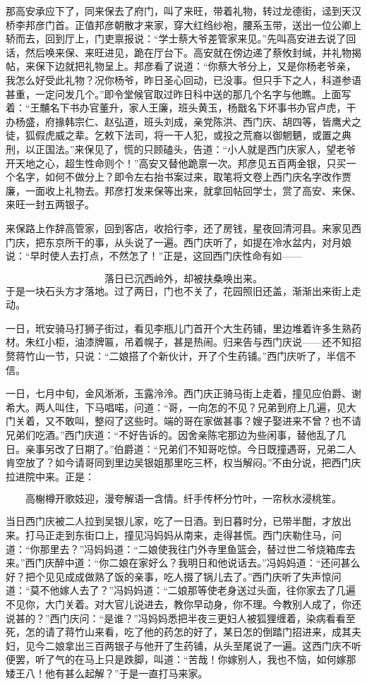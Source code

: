 那高安承应下了，同来保去了府门，叫了来旺，带着礼物，转过龙德街，迳到天汉桥李邦彦门首。正值邦彦朝散才来家，穿大红绉纱袍，腰系玉带，送出一位公卿上轿而去，回到厅上，门吏禀报说：“学士蔡大爷差管家来见。”先叫高安进去说了回话，然后唤来保、来旺进见，跪在厅台下。高安就在傍边递了蔡攸封缄，并礼物揭帖，来保下边就把礼物呈上。邦彦看了说道：“你蔡大爷分上，又是你杨老爷亲，我怎么好受此礼物？况你杨爷，昨日圣心回动，已没事。但只手下之人，科道参语甚重，一定问发几个。”即令堂候官取过昨日科中送的那几个名字与他瞧。上面写着：“王黼名下书办官董升，家人王廉，班头黄玉，杨戬名下坏事书办官卢虎，干办杨盛，府掾韩宗仁、赵弘道，班头刘成，亲党陈洪、西门庆、胡四等，皆鹰犬之徒，狐假虎威之辈。乞敕下法司，将一干人犯，或投之荒裔以御魍魉，或置之典刑，以正国法。”来保见了，慌的只顾磕头，告道：“小人就是西门庆家人，望老爷开天地之心，超生性命则个！”高安又替他跪禀一次。邦彦见五百两金银，只买一个名字，如何不做分上？即令左右抬书案过来，取笔将文卷上西门庆名字改作贾廉，一面收上礼物去。邦彦打发来保等出来，就拿回帖回学士，赏了高安、来保、来旺一封五两银子。

来保路上作辞高管家，回到客店，收拾行李，还了房钱，星夜回清河县。来家见西门庆，把东京所干的事，从头说了一遍。西门庆听了，如提在冷水盆内，对月娘说：“早时使人去打点，不然怎了！”正是，这回西门庆性命有如——

\[
落日已沉西岭外，却被扶桑唤出来。
\]
于是一块石头方才落地。过了两日，门也不关了，花园照旧还盖，渐渐出来街上走动。

一日，玳安骑马打狮子街过，看见李瓶儿门首开个大生药铺，里边堆着许多生熟药材。朱红小柜，油漆牌匾，吊着幌子，甚是热闹。归来告与西门庆说——还不知招赘蒋竹山一节，只说：“二娘搭了个新伙计，开了个生药铺。”西门庆听了，半信不信。

一日，七月中旬，金风淅淅，玉露泠泠。西门庆正骑马街上走着，撞见应伯爵、谢希大。两人叫住，下马唱喏，问道：“哥，一向怎的不见？兄弟到府上几遍，见大门关着，又不敢叫，整闷了这些时。端的哥在家做甚事？嫂子娶进来不曾？也不请兄弟们吃酒。”西门庆道：“不好告诉的。因舍亲陈宅那边为些闲事，替他乱了几日。亲事另改了日期了。”伯爵道：“兄弟们不知哥吃惊。今日既撞遇哥，兄弟二人肯空放了？如今请哥同到里边吴银姐那里吃三杯，权当解闷。”不由分说，把西门庆拉进院中来。正是：

\[
高榭樽开歌妓迎，漫夸解语一含情。
纤手传杯分竹叶，一帘秋水浸桃笙。
\]

当日西门庆被二人拉到吴银儿家，吃了一日酒。到日暮时分，已带半酣，才放出来。打马正走到东街口上，撞见冯妈妈从南来，走得甚慌。西门庆勒住马，问道：“你那里去？”冯妈妈道：“二娘使我往门外寺里鱼篮会，替过世二爷烧箱库去来。”西门庆醉中道：“你二娘在家好么？我明日和他说话去。”冯妈妈道：“还问甚么好？把个见见成成做熟了饭的亲事，吃人掇了锅儿去了。”西门庆听了失声惊问道：“莫不他嫁人去了？”冯妈妈道：“二娘那等使老身送过头面，往你家去了几遍不见你，大门关着。对大官儿说进去，教你早动身，你不理。今教别人成了，你还说甚的？”西门庆问：“是谁？”冯妈妈悉把半夜三更妇人被狐狸缠着，染病看看至死，怎的请了蒋竹山来看，吃了他的药怎的好了，某日怎的倒踏门招进来，成其夫妇，见今二娘拿出三百两银子与他开了生药铺，从头至尾说了一遍。这西门庆不听便罢，听了气的在马上只是跌脚，叫道：“苦哉！你嫁别人，我也不恼，如何嫁那矮王八！他有甚么起解？”于是一直打马来家。

